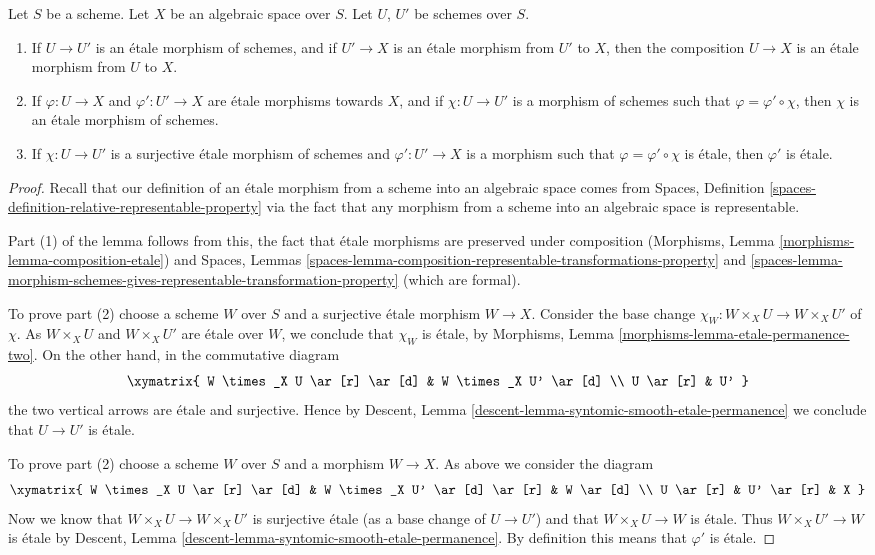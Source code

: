 \begin{lemma}
\label{lemma-etale-over-space}
Let $S$ be a scheme.
Let $X$ be an algebraic space over $S$.
Let $U$, $U'$ be schemes over $S$.
\begin{enumerate}
\item If $U \to U'$ is an \'etale morphism of schemes, and
if $U' \to X$ is an \'etale morphism from $U'$ to $X$, then the
composition $U \to X$ is an \'etale morphism from $U$ to $X$.
\item If $\varphi : U \to X$ and $\varphi' : U' \to X$ are
\'etale morphisms towards $X$, and if $\chi : U \to U'$ is a
morphism of schemes such that $\varphi = \varphi' \circ \chi$,
then $\chi$ is an \'etale morphism of schemes.
\item If $\chi : U \to U'$ is a surjective \'etale morphism
of schemes and $\varphi' : U' \to X$ is a morphism such that
$\varphi = \varphi' \circ \chi$ is \'etale, then $\varphi'$
is \'etale.
\end{enumerate}
\end{lemma}

\begin{proof}
Recall that our definition of an \'etale morphism from a scheme into an
algebraic space comes from
Spaces, Definition
\ref{spaces-definition-relative-representable-property}
via the fact that any morphism from a scheme into an algebraic space
is representable.

\medskip\noindent
Part (1) of the lemma follows from this, the fact that
\'etale morphisms are preserved under composition
(Morphisms, Lemma
\ref{morphisms-lemma-composition-etale})
and
Spaces, Lemmas
\ref{spaces-lemma-composition-representable-transformations-property} and
\ref{spaces-lemma-morphism-schemes-gives-representable-transformation-property}
(which are formal).

\medskip\noindent
To prove part (2) choose a scheme $W$ over $S$ and a
surjective \'etale morphism $W \to X$. Consider the base change
$\chi_W : W \times_X U \to W \times_X U'$ of $\chi$.
As $W \times_X U$ and $W \times_X U'$ are \'etale over $W$, we conclude that
$\chi_W$ is \'etale, by
Morphisms, Lemma \ref{morphisms-lemma-etale-permanence-two}.
On the other hand, in the commutative diagram
$$
\xymatrix{
W \times_X U \ar[r] \ar[d] & W \times_X U' \ar[d] \\
U \ar[r] & U'
}
$$
the two vertical arrows are \'etale and surjective.
Hence by
Descent, Lemma \ref{descent-lemma-syntomic-smooth-etale-permanence}
we conclude that $U \to U'$ is \'etale.

\medskip\noindent
To prove part (2) choose a scheme $W$ over $S$ and a morphism $W \to X$.
As above we consider the diagram
$$
\xymatrix{
W \times_X U \ar[r] \ar[d] & W \times_X U' \ar[d] \ar[r] & W \ar[d] \\
U \ar[r] & U' \ar[r] & X
}
$$
Now we know that $W \times_X U \to W \times_X U'$ is surjective \'etale
(as a base change of $U \to U'$)
and that $W \times_X U \to W$ is \'etale. Thus $W \times_X U' \to W$
is \'etale by Descent, Lemma
\ref{descent-lemma-syntomic-smooth-etale-permanence}. By definition
this means that $\varphi'$ is \'etale.
\end{proof}


